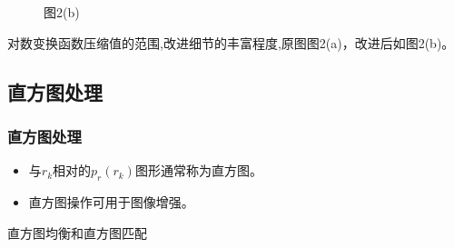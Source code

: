 \documentclass[notheorems,serif,table,compress]{beamer}  %
\begin{document}
\begin{frame}
\begin{figure}
\begin{minipage}[t]{0.4\linewidth}
          \caption{图2(b)}
        \end{minipage}
    \end{figure}
对数变换函数压缩值的范围,改进细节的丰富程度,原图图2(a)，改进后如图2(b)。
\end{frame}

\subsection{直方图处理}
 \begin{frame}
\frametitle{直方图处理}
    \begin{itemize}
        \item 与$r_{k}$相对的$p_{r}(r_{k})$图形通常称为直方图。
        \item 直方图操作可用于图像增强。
     \end{itemize}
     直方图均衡和直方图匹配
    
 \end{frame}
\end{document}
